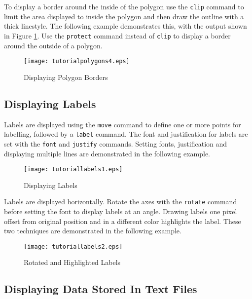 To display a border around the inside of the polygon
use the \texttt{clip}
command to limit the area displayed to inside the polygon
and then draw the outline with a thick linestyle.
The following example demonstrates this, with the output shown
in Figure \ref{tutorialpolygons4}.
Use the \texttt{protect} command instead of \texttt{clip}
to display a border around the outside of a polygon.



\begin{figure}[h]
\texttt{[image: tutorialpolygons4.eps]}
\caption{Displaying Polygon Borders}
\label{tutorialpolygons4}
\end{figure}

\subsection{Displaying Labels}

Labels are displayed using the \texttt{move}
command to define one or more points for labelling, followed by a
\texttt{label} command.  The font and justification for labels
are set with the \texttt{font} and \texttt{justify} commands.
Setting fonts, justification and displaying multiple lines
are demonstrated in the following example.



\begin{figure}[h]
\texttt{[image: tutoriallabels1.eps]}
\caption{Displaying Labels}
\label{tutoriallabels1}
\end{figure}

Labels are displayed horizontally.  Rotate the axes with the \texttt{rotate}
command before setting the font to display labels at an angle.  Drawing labels
one pixel offset from original position and in a different color highlights the
label.  These two techniques are demonstrated in the following example.



\begin{figure}[h]
\texttt{[image: tutoriallabels2.eps]}
\caption{Rotated and Highlighted Labels}
\label{tutoriallabels2}
\end{figure}

\subsection{Displaying Data Stored In Text Files}

